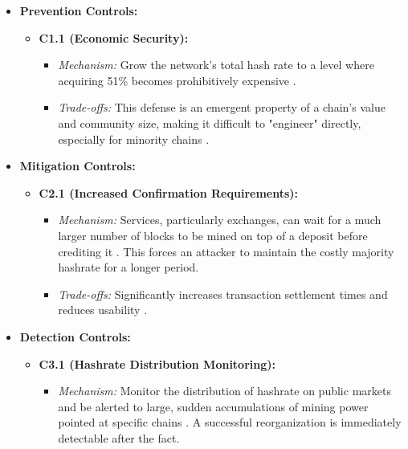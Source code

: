 \begin{itemize}
    \item \textbf{Prevention Controls:}
    \begin{itemize}
        \item \textbf{C1.1 (Economic Security):}
            \begin{itemize}
                \item \textit{Mechanism:} Grow the network's total hash rate to a level where acquiring 51\% becomes prohibitively expensive \cite{Wang2019}.
                \item \textit{Trade-offs:} This defense is an emergent property of a chain's value and community size, making it difficult to "engineer" directly, especially for minority chains \cite{Eyal2014}.
            \end{itemize}
    \end{itemize}
    \item \textbf{Mitigation Controls:}
    \begin{itemize}
        \item \textbf{C2.1 (Increased Confirmation Requirements):}
            \begin{itemize}
                \item \textit{Mechanism:} Services, particularly exchanges, can wait for a much larger number of blocks to be mined on top of a deposit before crediting it \cite{Casino2019}. This forces an attacker to maintain the costly majority hashrate for a longer period.
                \item \textit{Trade-offs:} Significantly increases transaction settlement times and reduces usability \cite{Casino2019}.
            \end{itemize}
    \end{itemize}
    \item \textbf{Detection Controls:}
    \begin{itemize}
        \item \textbf{C3.1 (Hashrate Distribution Monitoring):}
            \begin{itemize}
                \item \textit{Mechanism:} Monitor the distribution of hashrate on public markets and be alerted to large, sudden accumulations of mining power pointed at specific chains \cite{Wang2019}. A successful reorganization is immediately detectable after the fact.
            \end{itemize}
    \end{itemize}
\end{itemize}

